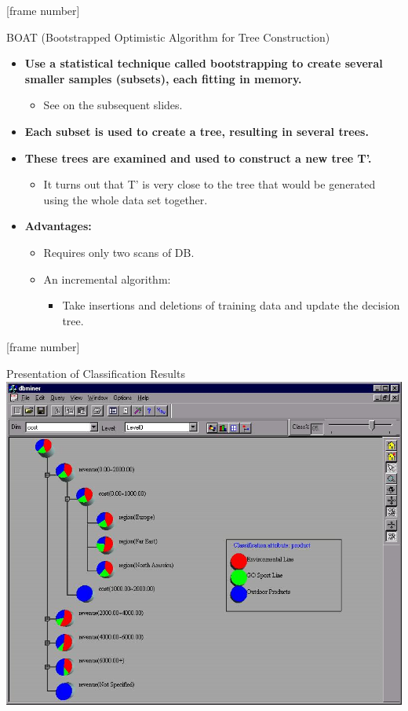 \documentclass[aspectratio=169,t,table]{beamer}
\begin{document}
  {
    [frame number]
    \begin{frame}{BOAT (Bootstrapped Optimistic Algorithm for Tree Construction)}
      \begin{itemize}
        \item \textbf{Use a statistical technique called bootstrapping to create several smaller samples (subsets), each fitting in memory.}
        \begin{itemize}
          \item See on the subsequent slides.
        \end{itemize}
        \item \textbf{Each subset is used to create a tree, resulting in several trees.}
        \item \textbf{These trees are examined and used to construct a new tree T'.}
        \begin{itemize}
          \item It turns out that T' is very close to the tree that would be generated \\
          using the whole data set together.
        \end{itemize}
        \item \textbf{Advantages:}
        \begin{itemize}
          \item Requires only two scans of DB.
          \item An incremental algorithm:
          \begin{itemize}
            \item Take insertions and deletions of training data and update the decision tree.
          \end{itemize}
        \end{itemize}
      \end{itemize}
    \end{frame}
  }

  {
    [frame number]
    \begin{frame}{Presentation of Classification Results}
      \centering
      \includegraphics[height=0.9\textheight]{img/classification1.jpeg}
    \end{frame}
  }
\end{document}

